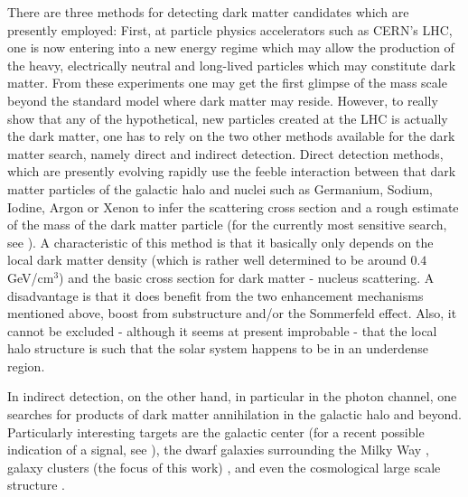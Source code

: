 \documentclass[10pt,aps,pra,reprint,amsmath,amsfonts,amssymb,showpacs]{revtex4-1}
\begin{document}
There are three methods for detecting dark matter candidates which are
presently employed: First, at particle physics accelerators such as
CERN's LHC, one is now entering into a new energy regime which may
allow the production of the heavy, electrically neutral and long-lived
particles which may constitute dark matter. From these experiments one
may get the first glimpse of the mass scale beyond the standard model
where dark matter may reside. However, to really show that any of the
hypothetical, new particles created at the LHC is actually the dark
matter, one has to rely on the two other methods available for the
dark matter search, namely direct and indirect detection. Direct
detection methods, which are presently evolving rapidly use the feeble
interaction between that dark matter particles of the galactic halo
and nuclei such as Germanium, Sodium, Iodine, Argon or Xenon to infer
the scattering cross section and a rough estimate of the mass of the
dark matter particle (for the currently most sensitive search, see
\cite{Aprile:2010um}). A characteristic of this method is that it
basically only depends on the local dark matter density (which is
rather well determined to be around $0.4$ GeV/cm$^3$) and the basic
cross section for dark matter - nucleus scattering. A disadvantage is
that it does benefit from the two enhancement mechanisms mentioned
above, boost from substructure and/or the Sommerfeld effect. Also, it
cannot be excluded - although it seems at present improbable - that
the local halo structure is such that the solar system happens to be
in an underdense region.

In indirect detection, on the other hand, in particular in the photon
channel, one searches for products of dark matter annihilation in the
galactic halo and beyond. Particularly interesting targets are the
galactic center (for a recent possible indication of a signal, see
\cite{Hooper:2010mq}), the dwarf galaxies surrounding the Milky Way
\cite{Strigari:2006rd,Essig:2009jx,2010JCAP...01..031S}, galaxy
clusters (the focus of this work)
\cite{Ghigna:1998vn,Lewis:2002mfa,Boyarsky:2006kc,2006A&A...455...21C,2009PhRvL.103r1302P},
and even the cosmological large scale structure
\cite{Bergstrom:2001jj,Ullio:2002pj,Taylor:2002zd,Elsaesser:2004ap,Cuoco:2010jb,Abazajian:2010sq,Abdo:2010dk,Zavala:2011tt}.
\end{document}
